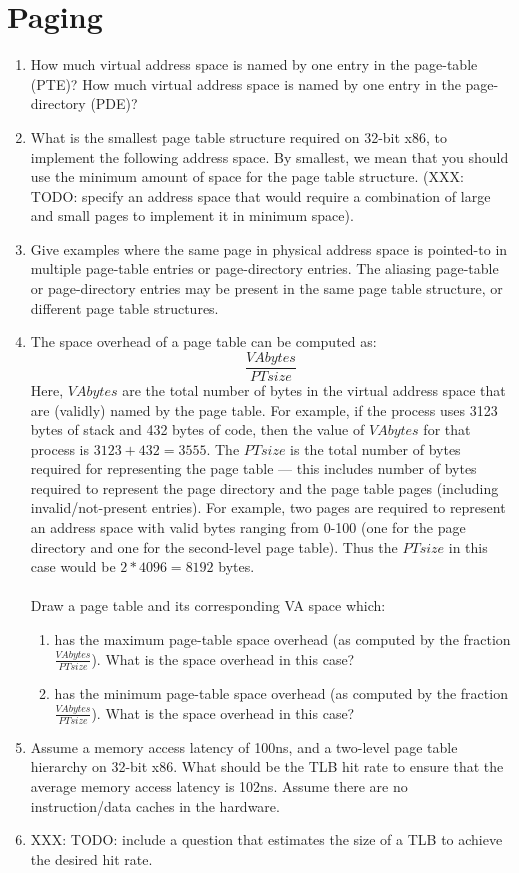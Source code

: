 \section{Paging}
\begin{enumerate}
\item How much virtual address space is named by one entry in the page-table (PTE)? How
much virtual address space is named by one entry in the page-directory (PDE)?
\item What is the smallest page table structure required on 32-bit
x86, to implement the following
address space. By smallest, we mean that you should use the minimum amount
of space for the page table structure. (XXX: TODO: specify an address space that would
require
a combination of large and small pages to implement it in minimum space).
\item Give examples where the same page in physical address space is pointed-to in
multiple page-table entries or page-directory entries. The aliasing
page-table or page-directory entries may be
present in the same page table structure, or different page table structures.
\item The space overhead of a page table can be computed as:
$$
\frac{VAbytes}{PTsize}
$$
Here, $VAbytes$ are the total number of bytes in the virtual address space that
are (validly) named by the page table. For example, if the process uses 3123 bytes of
stack and 432 bytes of code, then the value of $VAbytes$ for that process
is $3123+432=3555$. The $PTsize$ is the total number of bytes required for representing
the page table --- this includes number of bytes required to represent the page directory
and the page table pages (including invalid/not-present entries). For example,
two pages are required to represent an address space with valid
bytes ranging from 0-100 (one for the page directory and one for the second-level
page table). Thus the $PTsize$ in this case would be $2 * 4096 = 8192$ bytes.\\\\
Draw a page table and its corresponding VA space which:
\begin{enumerate}
\item has the maximum page-table space overhead (as computed by the fraction $\frac{VAbytes}{PTsize}$). What is the space overhead in this case?
\item has the minimum page-table space overhead (as computed by the fraction $\frac{VAbytes}{PTsize}$). What is the space overhead in this case?
\end{enumerate}
\item Assume a memory access latency of 100ns, and a two-level page table
hierarchy on 32-bit x86. What should be the TLB hit rate to ensure
that the average memory access latency is 102ns. Assume there are no instruction/data
caches in the hardware.
\item XXX: TODO: include a question that estimates the size of a TLB to achieve the
desired hit rate.
\end{enumerate}

